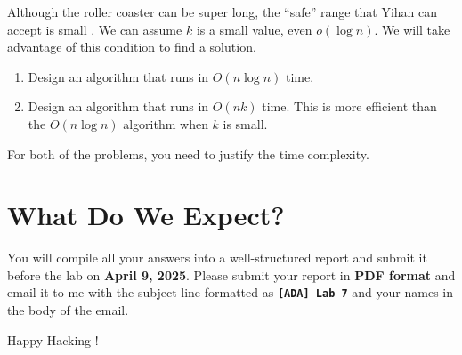 \documentclass[11pt]{article}
\begin{document}
Although the roller coaster can be super long, the ``safe'' range that Yihan can accept is small . We can assume $k$ is a small value, even $o(\log n)$. We will take advantage of this condition to find a solution.

\begin{tcolorbox}[title=Exercises]
    \begin{enumerate}
        \item Design an algorithm that runs in $O(n \log n)$ time.
        \item Design an algorithm that runs in $O(nk)$ time. This is more efficient than the $O(n \log n)$ algorithm when $k$ is small.
    \end{enumerate}
\end{tcolorbox}

For both of the problems, you need to justify the time complexity.

\section{What Do We Expect?}
You will compile all your answers into a well-structured report and submit it before the lab on \textbf{April 9, 2025}. Please submit your report in \textbf{PDF format} and email it to me with the subject line formatted as {\LARGE \textbf{\texttt{[ADA] Lab 7}}} and your names in the body of the email.

\vspace{5mm}
Happy Hacking !
\end{document}
